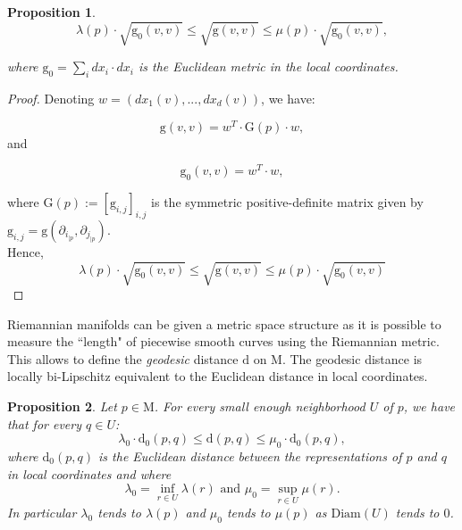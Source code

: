 \documentclass[pdflatex,sn-mathphys-ay]{sn-jnl}%
\newtheorem{proposition}{Proposition}[section]
\newcommand{\man}{\mathrm{M}}
\newcommand{\dis}{\mathrm{d}}
\newcommand{\diam}{\mathrm{Diam}}
\newcommand{\g}{\mathrm{g}}
\newcommand{\G}{\mathrm{G}}
\theoremstyle{thmstyleone}%
\begin{document}
\begin{appendices}
\begin{proposition}
$$\lambda(p)\cdot \sqrt{\g_0(v,v)}\leq \sqrt{\g(v,v)}\leq \mu(p)\cdot \sqrt{\g_0(v,v)},$$

where $\g_0=\sum_{i}dx_i\cdot dx_i$ is the Euclidean metric in the local coordinates.
\end{proposition}
\begin{proof}
Denoting $w=(dx_1(v),...,dx_d(v))$, we have:

$$\g(v,v)=w^T\cdot \G(p)\cdot w,$$
and 

$$\g_0(v,v)=w^T\cdot w,$$

where $\G(p):=\left[\g_{i,j}\right]_{i,j}$ is the symmetric positive-definite matrix given by $\g_{i,j}=\g(\partial_{i_{|p}},\partial_{j_{|p}})$.\\

Hence,
$$\lambda(p)\cdot \sqrt{\g_0(v,v)}\leq \sqrt{\g(v,v)}\leq \mu(p)\cdot \sqrt{\g_0(v,v)}$$

\end{proof}

Riemannian manifolds can be given a metric space structure as it is possible to measure the ``length" of piecewise smooth curves using the Riemannian metric. This allows to define the {\it geodesic} distance $\dis$ on $\man$. 
The geodesic distance is locally bi-Lipschitz equivalent to the Euclidean distance in local coordinates.

\begin{proposition}\label{prop:dis_equiv}Let $p\in\man$. For every small enough neighborhood $U$ of $p$, we have that for every $q\in U$:
$$\lambda_0\cdot\dis_0(p,q)\leq \dis(p,q)\leq\mu_0\cdot\dis_0(p,q),$$
where $\dis_0(p,q)$ is the Euclidean distance between the representations of $p$ and $q$ in local coordinates and where
$$\lambda_0=\inf_{r\in U}\lambda(r) \textrm{ and }
\mu_0=\sup_{r\in U}\mu(r).$$
In particular $\lambda_0$ tends to $ \lambda(p)$ and
$\mu_0$  tends to  $\mu(p)$ as $\diam(U)$ tends to $0$.
\end{proposition}



\end{appendices}
\end{document}
